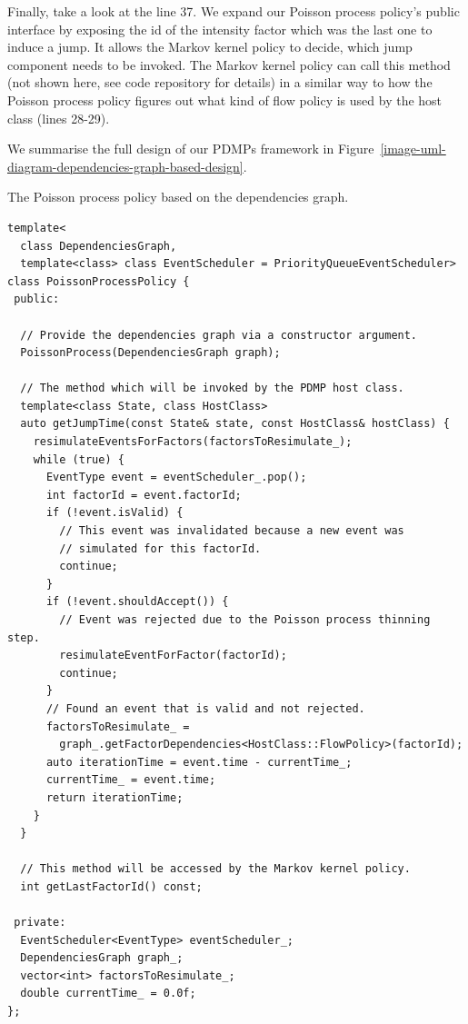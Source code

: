 \documentclass[report.tex]{subfiles}
\begin{document}
Finally, take a look at the line 37.
We expand our Poisson process policy's public interface by exposing the id
of the intensity factor which was the last one to induce a jump.
It allows the Markov kernel policy to decide, which jump component needs to be
invoked.
The Markov kernel policy can call this method (not shown here, see code repository for details)
in a similar way to how the Poisson process policy
figures out what kind of flow policy is used by the host class (lines 28-29).

We summarise the full design of our PDMPs framework in
Figure~\ref{image-uml-diagram-dependencies-graph-based-design}.


\begin{lstfloat}
\caption{The Poisson process policy based on the dependencies graph.}
\label{main-poisson-process-policy-implementation}
\begin{lstlisting}
template<
  class DependenciesGraph,
  template<class> class EventScheduler = PriorityQueueEventScheduler>
class PoissonProcessPolicy {
 public:

  // Provide the dependencies graph via a constructor argument.
  PoissonProcess(DependenciesGraph graph);

  // The method which will be invoked by the PDMP host class.
  template<class State, class HostClass>
  auto getJumpTime(const State& state, const HostClass& hostClass) {
    resimulateEventsForFactors(factorsToResimulate_);
    while (true) {
      EventType event = eventScheduler_.pop();
      int factorId = event.factorId;
      if (!event.isValid) {
        // This event was invalidated because a new event was
        // simulated for this factorId.
        continue;
      }
      if (!event.shouldAccept()) {
        // Event was rejected due to the Poisson process thinning step.
        resimulateEventForFactor(factorId);
        continue;
      }
      // Found an event that is valid and not rejected.
      factorsToResimulate_ =
        graph_.getFactorDependencies<HostClass::FlowPolicy>(factorId);
      auto iterationTime = event.time - currentTime_;
      currentTime_ = event.time;
      return iterationTime;
    }
  }

  // This method will be accessed by the Markov kernel policy.
  int getLastFactorId() const;

 private:
  EventScheduler<EventType> eventScheduler_;
  DependenciesGraph graph_;
  vector<int> factorsToResimulate_;
  double currentTime_ = 0.0f;
};
\end{lstlisting}
\end{lstfloat}
\end{document}

